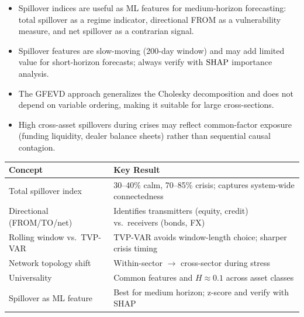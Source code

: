\begin{itemize}[nosep]
  \item Spillover indices are useful as ML features for medium-horizon forecasting:
        total spillover as a regime indicator, directional FROM as a vulnerability
        measure, and net spillover as a contrarian signal.

  \item Spillover features are slow-moving (200-day window) and may add limited value
        for short-horizon forecasts; always verify with $\operatorname{SHAP}$ importance analysis.

  \item The GFEVD approach generalizes the Cholesky decomposition and does not depend
        on variable ordering, making it suitable for large cross-sections.

  \item High cross-asset spillovers during crises may reflect common-factor exposure
        (funding liquidity, dealer balance sheets) rather than sequential causal
        contagion.
\end{itemize}

\begin{center}
\small
\begin{tabular}{p{4.5cm} p{8.5cm}}
\toprule
\textbf{Concept} & \textbf{Key Result} \\
\midrule
Total spillover index
  & 30--40\% calm, 70--85\% crisis; captures system-wide connectedness \\[4pt]
Directional (FROM/TO/net)
  & Identifies transmitters (equity, credit) vs.\ receivers (bonds, FX) \\[4pt]
Rolling window vs.\ TVP-VAR
  & TVP-VAR avoids window-length choice; sharper crisis timing \\[4pt]
Network topology shift
  & Within-sector $\to$ cross-sector during stress \\[4pt]
Universality
  & Common features and $H \approx 0.1$ across asset classes \\[4pt]
Spillover as ML feature
  & Best for medium horizon; z-score and verify with SHAP \\
\bottomrule
\end{tabular}
\end{center}
